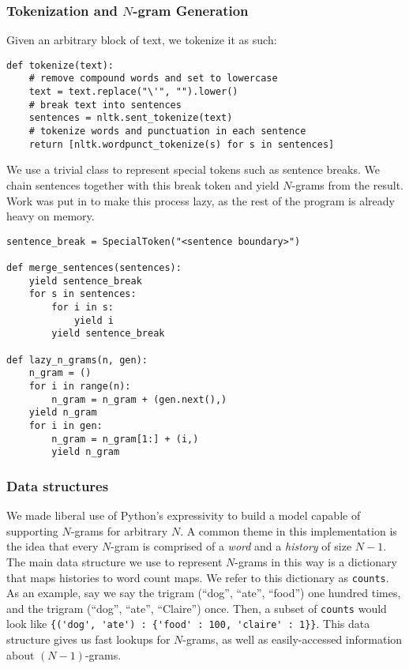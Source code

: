 \documentclass[12pt]{article}
\begin{document}
\subsubsection{Tokenization and $N$-gram Generation}
Given an arbitrary block of text, we tokenize it as such:
\begin{lstlisting}
def tokenize(text):
    # remove compound words and set to lowercase
    text = text.replace("\'", "").lower()
    # break text into sentences
	sentences = nltk.sent_tokenize(text)
    # tokenize words and punctuation in each sentence
    return [nltk.wordpunct_tokenize(s) for s in sentences]
\end{lstlisting}

We use a trivial class to represent special tokens such as sentence breaks. We chain sentences together with this break token and yield $N$-grams from the result. Work was put in to make this process lazy, as the rest of the program is already heavy on memory.

\begin{lstlisting}
sentence_break = SpecialToken("<sentence boundary>")

def merge_sentences(sentences):
	yield sentence_break
	for s in sentences:
		for i in s:
			yield i
		yield sentence_break

def lazy_n_grams(n, gen):
	n_gram = ()
	for i in range(n):
		n_gram = n_gram + (gen.next(),)
	yield n_gram
	for i in gen:
		n_gram = n_gram[1:] + (i,)
		yield n_gram
\end{lstlisting}

\subsubsection{Data structures}
We made liberal use of Python's expressivity to build a model capable of supporting $N$-grams for arbitrary $N$. A common theme in this implementation is the idea that every $N$-gram is comprised of a \emph{word} and a \emph{history} of size $N - 1$. The main data structure we use to represent $N$-grams in this way is a dictionary that maps histories to word count maps. We refer to this dictionary as \verb|counts|. As an example, say we say the trigram (``dog'', ``ate'',  ``food'') one hundred times, and the trigram (``dog'', ``ate'', ``Claire'') once. Then, a subset of \verb|counts| would look like \verb|{('dog', 'ate') : {'food' : 100, 'claire' : 1}}|. This data structure gives us fast lookups for $N$-grams, as well as easily-accessed information about $(N - 1)$-grams.
\end{document}
